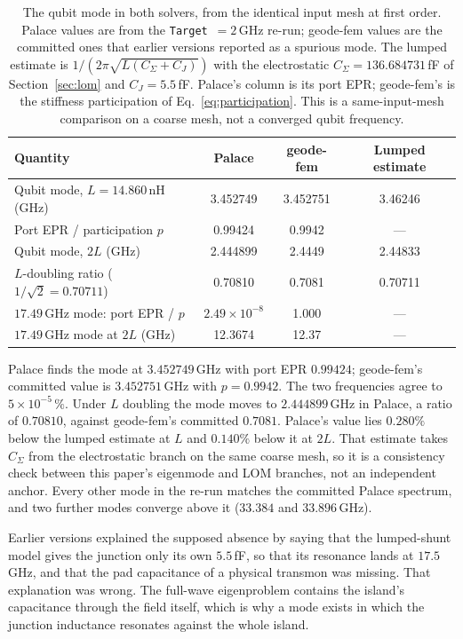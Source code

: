 \documentclass{anvil-paper}
\begin{document}
\begin{table}[t]
  \centering
  \caption{The qubit mode in both solvers, from the identical input mesh
  at first order. Palace values are from the \texttt{Target}~$= 2$\,GHz
  re-run; geode-fem values are the committed ones that earlier versions
  reported as a spurious mode. The lumped estimate is
  $1/(2\pi\sqrt{L(C_\Sigma + C_J)})$ with the electrostatic
  $C_\Sigma = 136.684731$\,fF of Section~\ref{sec:lom} and
  $C_J = 5.5$\,fF. Palace's column is its port EPR; geode-fem's is the
  stiffness participation of Eq.~\ref{eq:participation}. This is a
  same-input-mesh comparison on a coarse mesh, not a converged qubit
  frequency.}
  \label{tab:qubit}
  \small
  \begin{tabular}{@{}lccc@{}}
    \toprule
    Quantity & Palace & geode-fem & Lumped estimate \\
    \midrule
    Qubit mode, $L = 14.860$\,nH (GHz) & 3.452749 & 3.452751 & 3.46246 \\
    Port EPR / participation $p$ & 0.99424 & 0.9942 & --- \\
    Qubit mode, $2L$ (GHz) & 2.444899 & 2.4449 & 2.44833 \\
    $L$-doubling ratio ($1/\sqrt{2} = 0.70711$) & 0.70810 & 0.7081 & 0.70711 \\
    \midrule
    $17.49$\,GHz mode: port EPR / $p$ & $2.49\times10^{-8}$ & 1.000 & --- \\
    $17.49$\,GHz mode at $2L$ (GHz) & 12.3674 & 12.37 & --- \\
    \bottomrule
  \end{tabular}
\end{table}

Palace finds the mode at $3.452749$\,GHz with port EPR $0.99424$;
geode-fem's committed value is $3.452751$\,GHz with $p = 0.9942$. The two
frequencies agree to $5\times10^{-5}\,\%$. Under $L$ doubling the mode
moves to $2.444899$\,GHz in Palace, a ratio of $0.70810$, against
geode-fem's committed $0.7081$. Palace's value lies $0.280\%$ below the
lumped estimate at $L$ and $0.140\%$ below it at $2L$. That estimate
takes $C_\Sigma$ from the electrostatic branch on the same coarse mesh,
so it is a consistency check between this paper's eigenmode and LOM
branches, not an independent anchor. Every other mode in the re-run
matches the committed Palace spectrum, and two further modes converge
above it ($33.384$ and $33.896$\,GHz).

Earlier versions explained the supposed absence by saying that the
lumped-shunt model gives the junction only its own $5.5$\,fF, so that its
resonance lands at $17.5$\,GHz, and that the pad capacitance of a
physical transmon \citep{koch2007} was missing. That explanation was
wrong. The full-wave eigenproblem contains the island's capacitance
through the field itself, which is why a mode exists in which the
junction inductance resonates against the whole island.
\end{document}
